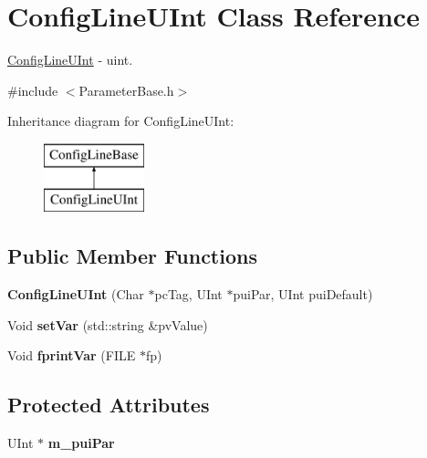 \hypertarget{class_config_line_u_int}{}\section{Config\+Line\+U\+Int Class Reference}
\label{class_config_line_u_int}


\hyperlink{class_config_line_u_int}{Config\+Line\+U\+Int} -\/ uint.  




{\ttfamily \#include $<$Parameter\+Base.\+h$>$}

Inheritance diagram for Config\+Line\+U\+Int\+:\begin{figure}[H]
\begin{center}
\leavevmode
\includegraphics[height=2.000000cm]{class_config_line_u_int}
\end{center}
\end{figure}
\subsection*{Public Member Functions}
\begin{DoxyCompactItemize}
\item 
\mbox{\label{class_config_line_u_int_acb0d037599b6447947678c85fad975ee}} 
{\bfseries Config\+Line\+U\+Int} (Char $\ast$pc\+Tag, U\+Int $\ast$pui\+Par, U\+Int pui\+Default)
\item 
\mbox{\label{class_config_line_u_int_a1cd46e08503002f9e76ac38520d885ae}} 
Void {\bfseries set\+Var} (std\+::string \&pv\+Value)
\item 
\mbox{\label{class_config_line_u_int_a4d2d13d31eb3f66465486e3abea8bf02}} 
Void {\bfseries fprint\+Var} (F\+I\+LE $\ast$fp)
\end{DoxyCompactItemize}
\subsection*{Protected Attributes}
\begin{DoxyCompactItemize}
\item 
\mbox{\label{class_config_line_u_int_a865997c21f034ad3a942f8701763bedd}} 
U\+Int $\ast$ {\bfseries m\+\_\+pui\+Par}
\end{DoxyCompactItemize}

